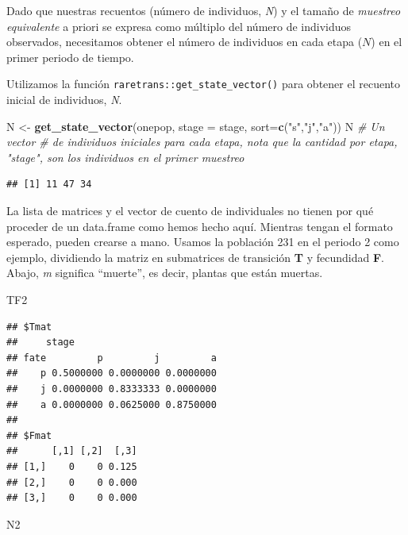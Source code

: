 \documentclass[
]{book}
\newenvironment{Shaded}{\begin{snugshade}}{\end{snugshade}}
\newcommand{\AttributeTok}[1]{\textcolor[rgb]{0.13,0.29,0.53}{#1}}
\newcommand{\CommentTok}[1]{\textcolor[rgb]{0.56,0.35,0.01}{\textit{#1}}}
\newcommand{\FunctionTok}[1]{\textcolor[rgb]{0.13,0.29,0.53}{\textbf{#1}}}
\newcommand{\NormalTok}[1]{#1}
\newcommand{\OtherTok}[1]{\textcolor[rgb]{0.56,0.35,0.01}{#1}}
\newcommand{\StringTok}[1]{\textcolor[rgb]{0.31,0.60,0.02}{#1}}
\theoremstyle{definition}
\theoremstyle{definition}
\theoremstyle{definition}
\theoremstyle{definition}
\theoremstyle{remark}
\begin{document}
Dado que nuestras recuentos (número de individuos, \emph{N}) y el tamaño de \emph{muestreo equivalente} a priori se expresa como múltiplo del número de individuos observados, necesitamos obtener el número de individuos en cada etapa (\(N\)) en el primer periodo de tiempo.

Utilizamos la función \texttt{raretrans::get\_state\_vector()} para obtener el recuento inicial de individuos, \emph{N}.

\begin{Shaded}
\begin{Highlighting}[]
\NormalTok{N }\OtherTok{\textless{}{-}} \FunctionTok{get\_state\_vector}\NormalTok{(onepop, }\AttributeTok{stage =}\NormalTok{ stage, }\AttributeTok{sort=}\FunctionTok{c}\NormalTok{(}\StringTok{"s"}\NormalTok{,}\StringTok{"j"}\NormalTok{,}\StringTok{"a"}\NormalTok{)) }
\NormalTok{N }\CommentTok{\# Un vector \# de individuos iniciales para cada etapa, nota que la cantidad por etapa, "stage", son los individuos en el primer muestreo}
\end{Highlighting}
\end{Shaded}

\begin{verbatim}
## [1] 11 47 34
\end{verbatim}

La lista de matrices y el vector de cuento de individuales no tienen por qué proceder de un data.frame como hemos hecho aquí. Mientras tengan el formato esperado, pueden crearse a mano. Usamos la población 231 en el periodo 2 como ejemplo, dividiendo la matriz en submatrices de transición \textbf{T} y fecundidad \textbf{F}. Abajo, \emph{m} significa ``muerte'', es decir, plantas que están muertas.

\begin{Shaded}
\begin{Highlighting}[]
\NormalTok{TF2}
\end{Highlighting}
\end{Shaded}

\begin{verbatim}
## $Tmat
##     stage
## fate         p         j         a
##    p 0.5000000 0.0000000 0.0000000
##    j 0.0000000 0.8333333 0.0000000
##    a 0.0000000 0.0625000 0.8750000
## 
## $Fmat
##      [,1] [,2]  [,3]
## [1,]    0    0 0.125
## [2,]    0    0 0.000
## [3,]    0    0 0.000
\end{verbatim}

\begin{Shaded}
\begin{Highlighting}[]
\NormalTok{N2}
\end{Highlighting}
\end{Shaded}
\end{document}
